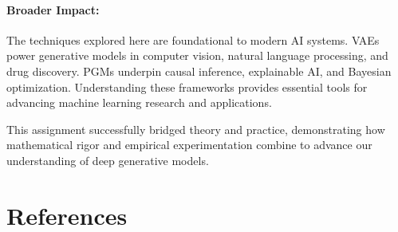 \documentclass[conference]{IEEEtran}
\begin{document}
\paragraph{Broader Impact:} The techniques explored here are foundational to modern AI systems. VAEs power generative models in computer vision, natural language processing, and drug discovery. PGMs underpin causal inference, explainable AI, and Bayesian optimization. Understanding these frameworks provides essential tools for advancing machine learning research and applications.

This assignment successfully bridged theory and practice, demonstrating how mathematical rigor and empirical experimentation combine to advance our understanding of deep generative models.

\section*{References}
\end{document}
